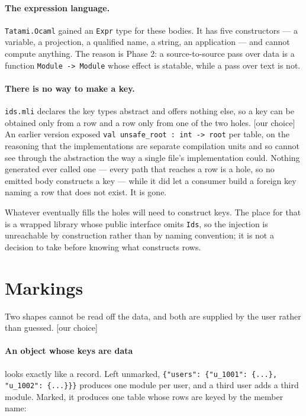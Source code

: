 \documentclass[11pt,a4paper]{article}
\newcommand{\ourcall}{\textcolor{ours}{\textsf{[our choice]}}}
\begin{document}
\paragraph{The expression language.} \texttt{Tatami.Ocaml} gained an
\texttt{Expr} type for these bodies. It has five constructors --- a variable,
a projection, a qualified name, a string, an application --- and cannot
compute anything. The reason is Phase 2: a source-to-source pass over data is
a function \texttt{Module -> Module} whose effect is statable, while a pass
over text is not.

\paragraph{There is no way to make a key.} \texttt{ids.mli} declares the key
types abstract and offers nothing else, so a key can be obtained only from a
row and a row only from one of the two holes. \ourcall{} An earlier version
exposed \texttt{val unsafe\_root : int -> root} per table, on the reasoning
that the implementations are separate compilation units and so cannot see
through the abstraction the way a single file's implementation could. Nothing
generated ever called one --- every path that reaches a row is a hole, so no
emitted body constructs a key --- while it did let a consumer build a foreign
key naming a row that does not exist. It is gone.

Whatever eventually fills the holes will need to construct keys. The place
for that is a wrapped library whose public interface omits \texttt{Ids}, so
the injection is unreachable by construction rather than by naming
convention; it is not a decision to take before knowing what constructs
rows.

\section{Markings}

Two shapes cannot be read off the data, and both are supplied by the user
rather than guessed. \ourcall{}

\paragraph{An object whose keys are data} looks exactly like a record. Left
unmarked, \texttt{\{"users": \{"u\_1001": \{...\}, "u\_1002": \{...\}\}\}}
produces one module per user, and a third user adds a third module. Marked, it
produces one table whose rows are keyed by the member name:
\end{document}
